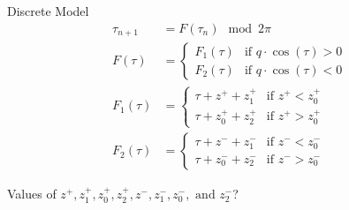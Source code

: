 \begin{frame}{Discrete Model}
    \vspace{-2em}
    \begin{align*}
        \tau_{n+1} & =  F(\tau_n) \mod 2 \pi
        \\
        F(\tau)    & = \begin{cases}
                            F_1(\tau) & \text{if } q \cdot \cos(\tau) > 0 \\
                            F_2(\tau) & \text{if } q \cdot \cos(\tau) < 0
                        \end{cases}
        \\
        F_1(\tau)  & = \begin{cases}
                            \tau + z^{+} + z_{1}^{+}     & \text{if } z^{+} < z_{0}^{+} \\
                            \tau + z_{0}^{+} + z_{2}^{+} & \text{if } z^{+} > z_{0}^{+}
                        \end{cases}
        \\
        F_2(\tau)  & = \begin{cases}
                            \tau + z^{-} + z_{1}^{-}     & \text{if } z^{-} < z_{0}^{-} \\
                            \tau + z_{0}^{-} + z_{2}^{-} & \text{if } z^{-} > z_{0}^{-}
                        \end{cases}
    \end{align*}

    \vspace{1em}
    Values of $ z^{+}, z_{1}^{+}, z_{0}^{+}, z_{2}^{+}, z^{-}, z_{1}^{-}, z_{0}^{-}, \text{ and } z_{2}^{-}$?
\end{frame}

